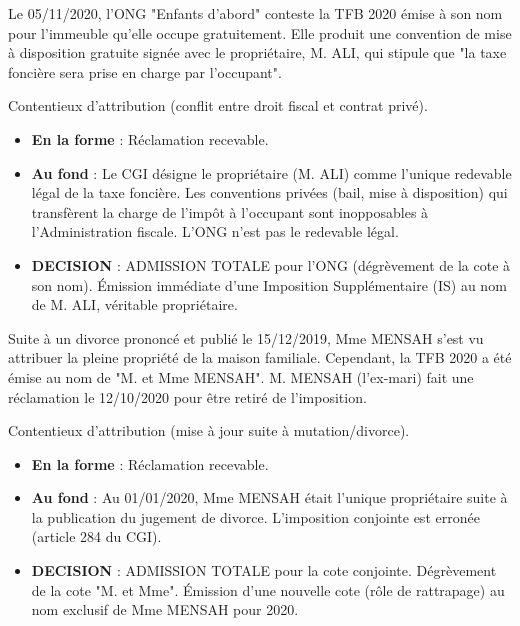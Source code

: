 \documentclass[a4paper, 11pt]{exam}
\begin{document}
\begin{questions}
		\question Le 05/11/2020, l'ONG "Enfants d'abord" conteste la TFB 2020 émise à son nom pour l'immeuble qu'elle occupe gratuitement. Elle produit une convention de mise à disposition gratuite signée avec le propriétaire, M. ALI, qui stipule que "la taxe foncière sera prise en charge par l'occupant".
		\begin{solution}
			Contentieux d'attribution (conflit entre droit fiscal et contrat privé).
			\begin{itemize}
				\item \textbf{En la forme} : Réclamation recevable.
				\item \textbf{Au fond} : Le CGI désigne le propriétaire (M. ALI) comme l'unique redevable légal de la taxe foncière. Les conventions privées (bail, mise à disposition) qui transfèrent la charge de l'impôt à l'occupant sont inopposables à l'Administration fiscale. L'ONG n'est pas le redevable légal.
				\item \textbf{DECISION} : ADMISSION TOTALE pour l'ONG (dégrèvement de la cote à son nom). Émission immédiate d'une Imposition Supplémentaire (IS) au nom de M. ALI, véritable propriétaire.
			\end{itemize}
		\end{solution}
		
		\question Suite à un divorce prononcé et publié le 15/12/2019, Mme MENSAH s'est vu attribuer la pleine propriété de la maison familiale. Cependant, la TFB 2020 a été émise au nom de "M. et Mme MENSAH". M. MENSAH (l'ex-mari) fait une réclamation le 12/10/2020 pour être retiré de l'imposition.
		\begin{solution}
			Contentieux d'attribution (mise à jour suite à mutation/divorce).
			\begin{itemize}
				\item \textbf{En la forme} : Réclamation recevable.
				\item \textbf{Au fond} : Au 01/01/2020, Mme MENSAH était l'unique propriétaire suite à la publication du jugement de divorce. L'imposition conjointe est erronée (article 284 du CGI).
				\item \textbf{DECISION} : ADMISSION TOTALE pour la cote conjointe. Dégrèvement de la cote "M. et Mme". Émission d'une nouvelle cote (rôle de rattrapage) au nom exclusif de Mme MENSAH pour 2020.
			\end{itemize}
		\end{solution}
		
		

\end{questions}
\end{document}
